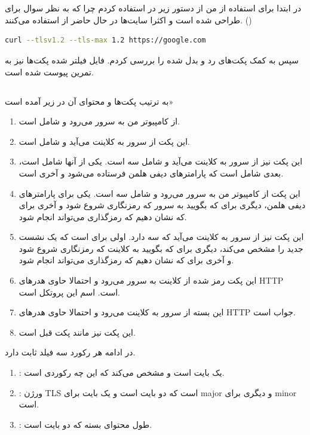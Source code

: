 \documentclass[]{article}
\begin{document}
\section{}
در ابتدا برای استفاده از
من از دستور زیر در
استفاده کردم چرا که به نظر سوال برای 
طراحی شده است و اکثرا سایت‌ها در حال حاضر از
استفاده می‌کنند.
()
\begin{latin}
\begin{lstlisting}[language=sh]
curl --tlsv1.2 --tls-max 1.2 https://google.com
\end{lstlisting}
\end{latin}
سپس به کمک
پکت‌های رد و بدل شده را بررسی کردم. فایل فیلتر شده پکت‌ها نیز به تمرین پیوست شده است.
\subsection{}
به ترتیب پکت‌ها و محتوای آن در زیر آمده است»
\begin{enumerate}
    \item از کامپیوتر من به سرور می‌رود و شامل  است.
    \item این پکت از سرور به کلاینت می‌آید و شامل  است.
    \item این پکت نیز از سرور به کلاینت می‌آید و شامل سه  است. یکی از آنها شامل  است، بعدی شامل  است که پارامتر‌های دیفی هلمن فرستاده می‌شود و آخری  است.
    \item این پکت از کامپیوتر من به سرور می‌رود و شامل سه  است. یکی برای پارامتر‌های دیفی هلمن، دیگری برای  که بگویید به سرور که رمزنگاری شروع شود و آخری برای  که نشان دهیم که رمزگذاری می‌تواند انجام شود.
    \item این پکت نیز از سرور به کلاینت می‌آید که سه  دارد. اولی برای  است که یک نشست جدید را مشخص می‌کند، دیگری برای  که بگویید به کلاینت که رمزنگاری شروع شود و آخری برای  که نشان دهیم که رمزگذاری می‌تواند انجام شود.
    \item این پکت رمز شده از کلاینت به سرور می‌رود و احتمالا حاوی هدرهای HTTP است. اسم این پروتکل  است.
    \item این بسته از سرور به کلاینت می‌رود و احتمالا حاوی هدر‌های HTTP جواب است.
    \item این پکت نیز مانند پکت قبل است.
\end{enumerate}
در ادامه هر رکورد سه فیلد ثابت دارد.
\begin{enumerate}
    \item \textbf{}: یک بایت است و مشخص می‌کند که این چه رکوردی است.
    \item \textbf{}: ورژن TLS است که دو بایت است و یک بایت برای major و دیگری برای minor است.
    \item \textbf{}: طول محتوای بسته که دو بایت است.
\end{enumerate}
\end{document}
